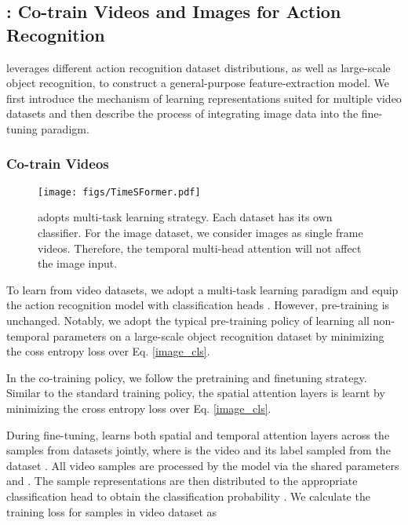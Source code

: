 \subsection{\ourmethod: Co-train Videos and Images for Action Recognition}

\ourmethod leverages different action recognition dataset distributions, as well as large-scale object recognition, to construct a general-purpose feature-extraction model. We first introduce the mechanism of learning representations suited for multiple video datasets and then describe the process of integrating image data into the fine-tuning paradigm. 


\vspace{-10pt}

\subsubsection{Co-train Videos}

\label{sec:defacto}
\begin{figure*}[t]
  \centering
  \texttt{[image: figs/TimeSFormer.pdf]}  
\caption{\ourmethod adopts multi-task learning strategy. Each dataset has its own classifier. For the image dataset, we consider images as single frame videos. Therefore, the temporal multi-head attention will not affect the image input.}
\label{fig:cover}
\vspace{-12pt}
\end{figure*}


To learn from  video datasets, we adopt a multi-task learning paradigm and equip the action recognition model  with  classification heads . However, pre-training is unchanged. Notably, we adopt the typical pre-training policy of learning all non-temporal parameters on a large-scale object recognition dataset by minimizing the coss entropy loss over Eq. \ref{image_cls}. 

In the co-training policy, we follow the pretraining and finetuning strategy. Similar to the standard training policy, the spatial attention layers  is learnt by minimizing the cross entropy loss over Eq. \ref{image_cls}. 


During fine-tuning, \ourmethod learns both spatial and temporal attention layers across the samples  from  datasets jointly, where  is the video and its label sampled from the dataset . All video samples are processed by the model  via the shared parameters  and . The sample representations are then distributed to the appropriate classification head to obtain the classification probability . We calculate the training loss for samples in video dataset  as




